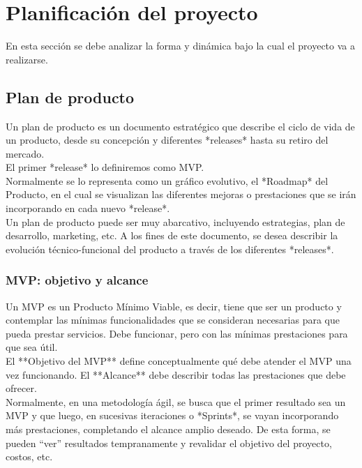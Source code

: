 \section{Planificación del proyecto}
{\consigna
En esta sección se debe analizar la forma y dinámica bajo la cual el proyecto va a realizarse.
}

\subsection{Plan de producto}
{\consigna
Un plan de producto es un documento estratégico que describe el ciclo de vida de un producto, desde su concepción y diferentes *releases* hasta su retiro del mercado.\\
El primer *release* lo definiremos como MVP.\\
Normalmente se lo representa como un gráfico evolutivo, el *Roadmap* del Producto, en el cual se visualizan las diferentes mejoras o prestaciones que se irán incorporando en cada nuevo *release*.\\
Un plan de producto puede ser muy abarcativo, incluyendo estrategias, plan de desarrollo, marketing, etc. A los fines de este documento, se desea describir la evolución técnico-funcional del producto a través de los diferentes *releases*.
}

\subsubsection{MVP: objetivo y alcance}
{\consigna
Un MVP es un Producto Mínimo Viable, es decir, tiene que ser un producto y contemplar las mínimas funcionalidades que se consideran necesarias para que pueda prestar servicios. Debe funcionar, pero con las mínimas prestaciones para que sea útil.\\
El **Objetivo del MVP** define conceptualmente qué debe atender el MVP una vez funcionando. El **Alcance** debe describir todas las prestaciones que debe ofrecer.\\
Normalmente, en una metodología ágil, se busca que el primer resultado sea un MVP y que luego, en sucesivas iteraciones o *Sprints*, se vayan incorporando más prestaciones, completando el alcance amplio deseado. De esta forma, se pueden “ver” resultados tempranamente y revalidar el objetivo del proyecto, costos, etc.
}


